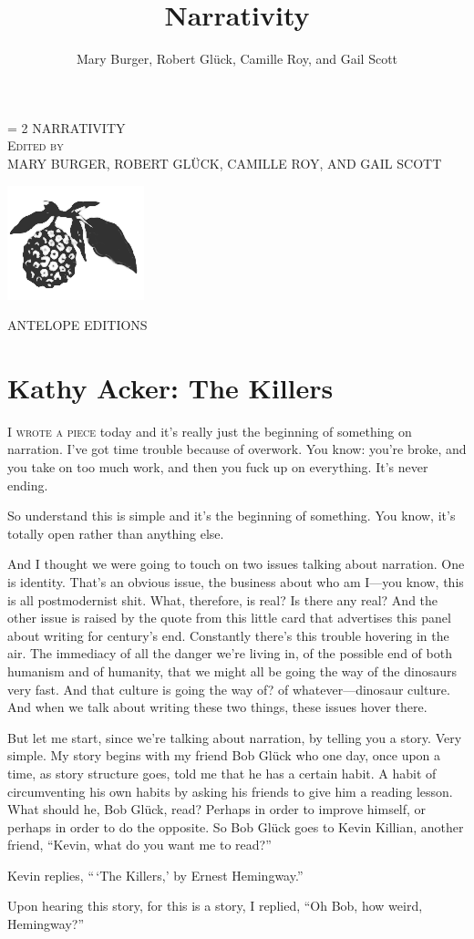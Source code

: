 \documentclass[
]{memoir}
\title{Narrativity}
\author{Mary Burger, Robert Glück, Camille Roy, and Gail Scott}
\date{}
\newlength{\drop}%
\newcommand*{\titleWH}{\begingroup%
\drop = 2\baselineskip
\centering
\vspace*{\drop}
\settowidth{\unitlength}{\Huge\uppercase{Narrativity}}
\vspace*{\baselineskip}
{\Huge\color{red} \uppercase{Narrativity}}\\[\drop]
{\Large\scshape Edited by}\\[\drop]
{\Large\uppercase{Mary Burger, Robert Glück, Camille Roy, and Gail Scott}}\\[\baselineskip]
\vspace*{\drop}
\begin{center} \includegraphics{images/pandanus.png} \end{center}
\vspace*{\drop}
{\Large ANTELOPE EDITIONS}\\
{\scshape \the\year{}}\par
\vspace*{\drop}
\endgroup}
\begin{document}
\titleWH


\frontmatter


\setcounter{tocdepth}{0}
\tableofcontents



\mainmatter

\hypertarget{kathy-acker-the-killers}{%
\chapter{Kathy Acker: The Killers}\label{kathy-acker-the-killers}}

\lettrine[lines=3, findent=0em, nindent=0.1em, lhang=0]{I}{ wrote a piece}
today and it's really just the beginning of something on narration. I've
got time trouble because of overwork. You know: you're broke, and you
take on too much work, and then you fuck up on everything. It's never
ending.

So understand this is simple and it's the beginning of something. You
know, it's totally open rather than anything else.

And I thought we were going to touch on two issues talking about
narration. One is identity. That's an obvious issue, the business about
who am I---you know, this is all postmodernist shit. What, therefore, is
real? Is there any real? And the other issue is raised by the quote from
this little card that advertises this panel about writing for century's
end. Constantly there's this trouble hovering in the air. The immediacy
of all the danger we're living in, of the possible end of both humanism
and of humanity, that we might all be going the way of the dinosaurs
very fast. And that culture is going the way of? of whatever---dinosaur
culture. And when we talk about writing these two things, these issues
hover there.

But let me start, since we're talking about narration, by telling you a
story. Very simple. My story begins with my friend Bob Glück who one
day, once upon a time, as story structure goes, told me that he has a
certain habit. A habit of circumventing his own habits by asking his
friends to give him a reading lesson. What should he, Bob Glück, read?
Perhaps in order to improve himself, or perhaps in order to do the
opposite. So Bob Glück goes to Kevin Killian, another friend, ``Kevin,
what do you want me to read?''

Kevin replies, ``\,`The Killers,' by Ernest Hemingway.''

Upon hearing this story, for this is a story, I replied, ``Oh Bob, how
weird, Hemingway?''
\end{document}
